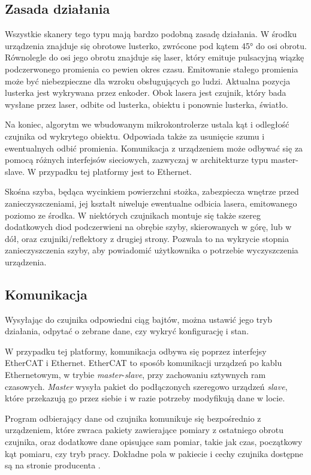 	\subsection{Zasada działania}
		Wszystkie skanery tego typu mają bardzo podobną zasadę działania.
		W środku urządzenia znajduje się obrotowe lusterko, zwrócone pod kątem 45° do osi obrotu.
		Równolegle do osi jego obrotu znajduje się laser, który emituje pulsacyjną wiązkę podczerwonego promienia co pewien okres czasu.
		Emitowanie stałego promienia może być niebezpieczne dla wzroku obsługujących go ludzi.
		Aktualna pozycja lusterka jest wykrywana przez enkoder.
		Obok lasera jest czujnik, który bada wysłane przez laser, odbite od lusterka, obiektu i ponownie lusterka, światło.

		Na koniec, algorytm we wbudowanym mikrokontrolerze ustala kąt i odległość czujnika od wykrytego obiektu.
		Odpowiada także za usunięcie szumu i ewentualnych odbić promienia.
		Komunikacja z urządzeniem może odbywać się za pomocą różnych interfejsów sieciowych, zazwyczaj w architekturze typu master-slave.
		W przypadku tej platformy jest to Ethernet.
		
		Skośna szyba, będąca wycinkiem powierzchni stożka, zabezpiecza wnętrze przed zanieczyszczeniami, jej kształt niweluje ewentualne odbicia lasera, emitowanego poziomo ze środka.
		W niektórych czujnikach montuje się także szereg dodatkowych diod podczerwieni na obrębie szyby, skierowanych w górę, lub w dół, oraz czujniki/reflektory z drugiej strony.
		Pozwala to na wykrycie stopnia zanieczyszczenia szyby, aby powiadomić użytkownika o potrzebie wyczyszczenia urządzenia.

	\subsection{Komunikacja}
		Wysyłając do czujnika odpowiedni ciąg bajtów, można ustawić jego tryb działania, odpytać o zebrane dane, czy wykryć konfigurację i stan.

		W przypadku tej platformy, komunikacja odbywa się poprzez interfejsy EtherCAT i Ethernet.
		EtherCAT to sposób komunikacji urządzeń po kablu Ethernetowym, w trybie \emph{master}-\emph{slave}, przy zachowaniu sztywnych ram czasowych. 
		\emph{Master} wysyła pakiet do podłączonych szeregowo urządzeń \emph{slave}, które przekazują go przez siebie i w razie potrzeby modyfikują dane w locie.
		
		Program odbierający dane od czujnika komunikuje się bezpośrednio z urządzeniem, które zwraca pakiety zawierające pomiary z ostatniego obrotu czujnika, oraz dodatkowe dane 
		opisujące sam pomiar, takie jak czas, początkowy kąt pomiaru, czy tryb pracy.
		Dokładne pola w pakiecie i cechy czujnika dostępne są na stronie producenta \cite{sick_website}.

